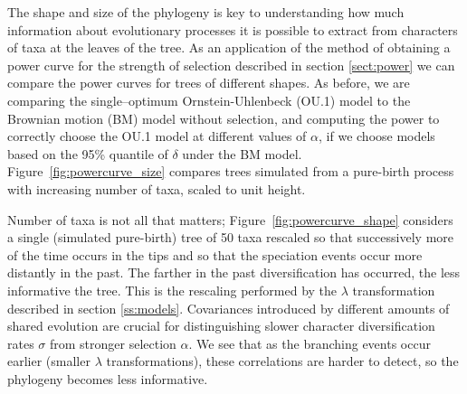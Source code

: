 The shape and size of the phylogeny is key to understanding how much information about evolutionary processes 
it is possible to extract from characters of taxa at the leaves of the tree. 
As an application of the method of obtaining a power curve for the strength of selection described in section \ref{sect:power} 
we can compare the power curves for trees of different shapes.
As before, we are comparing
the single--optimum Ornstein-Uhlenbeck (OU.1) model to the Brownian motion (BM) model without selection,
and computing the power to correctly choose the OU.1 model at different values of $\alpha$,
if we choose models based on the 95\% quantile of $\delta$ under the BM model.
Figure~\ref{fig:powercurve_size} compares trees simulated from 
a pure-birth process with increasing number of taxa, scaled to unit height.

Number of taxa is not all that matters;
Figure~\ref{fig:powercurve_shape} considers a single (simulated pure-birth) tree of 50 taxa rescaled 
so that successively more of the time occurs in the tips and so that the speciation events occur more distantly in the past.
The farther in the past diversification has occurred, the less informative the tree.
This is the rescaling performed by the $\lambda$ transformation described in section \ref{ss:models}.
Covariances introduced by different amounts of shared evolution are crucial 
for distinguishing slower character diversification rates $\sigma$ from stronger selection $\alpha$.  
We see that as the branching events occur earlier (smaller $\lambda$ transformations),
these correlations are harder to detect,
so the phylogeny becomes less informative.

